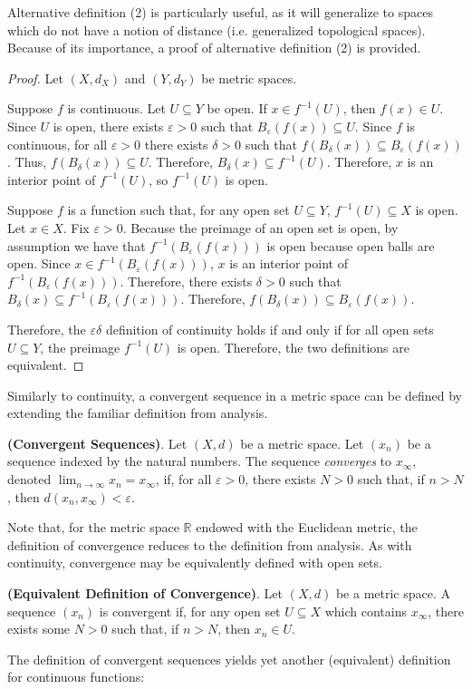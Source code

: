 Alternative definition (2) is particularly useful, as it will generalize to spaces which do not have a notion of distance (i.e. generalized topological spaces). Because of its importance, a proof of alternative definition (2) is provided.
\begin{framed}
\newpage\begin{proof}
    Let $(X,d_X)$ and $(Y,d_Y)$ be metric spaces.
    
    Suppose $f$ is continuous. Let $U\subseteq Y$ be open. If $x\in f^{-1}(U)$, then $f(x)\in U$. Since $U$ is open, there exists $\varepsilon>0$ such that $B_\varepsilon(f(x))\subseteq U$. Since $f$ is continuous, for all $\varepsilon>0$ there exists $\delta>0$ such that $f(B_\delta(x))\subseteq B_\varepsilon(f(x))$. Thus, $f(B_\delta(x))\subseteq U$. Therefore, $B_\delta(x)\subseteq f^{-1}(U)$. Therefore, $x$ is an interior point of $f^{-1}(U)$, so $f^{-1}(U)$ is open.


    Suppose $f$ is a function such that, for any open set $U\subseteq Y$, $f^{-1}(U)\subseteq X$ is open. Let $x\in X$. Fix $\varepsilon>0$. Because the preimage of an open set is open, by assumption we have that $f^{-1}(B_\varepsilon(f(x)))$ is open because open balls are open. Since $x\in f^{-1}(B_\varepsilon(f(x)))$, $x$ is an interior point of $f^{-1}(B_\varepsilon(f(x)))$. Therefore, there exists $\delta>0$ such that $B_\delta(x)\subseteq f^{-1}(B_\varepsilon(f(x)))$. Therefore, $f(B_\delta(x))\subseteq B_\varepsilon(f(x))$.

    Therefore, the $\varepsilon\delta$ definition of continuity holds if and only if for all open sets $U\subseteq Y$, the preimage $f^{-1}(U)$ is open. Therefore, the two definitions are equivalent.
\end{proof}
\end{framed}

Similarly to continuity, a convergent sequence in a metric space can be defined by extending the familiar definition from analysis.
\begin{defn} \textbf{(Convergent Sequences)}. Let $(X,d)$ be a metric space. Let $(x_n)$ be a sequence indexed by the natural numbers. The sequence \textit{converges} to $x_\infty$, denoted $\lim_{n\to\infty} x_n = x_\infty$, if, for all $\varepsilon>0$, there exists $N>0$ such that, if $n>N$, then $d(x_n,x_\infty)<\varepsilon$.
\end{defn}
Note that, for the metric space $\mathbb{R}$ endowed with the Euclidean metric, the definition of convergence reduces to the definition from analysis. As with continuity, convergence may be equivalently defined with open sets.
\vspace{1em}
\begin{defn}
    \textbf{(Equivalent Definition of Convergence)}. Let $(X,d)$ be a metric space. A sequence $(x_n)$ is convergent if, for any open set $U\subseteq X$ which contains $x_\infty$, there exists some $N>0$ such that, if $n>N$, then $x_n\in U$.
\end{defn}
The definition of convergent sequences yields yet another (equivalent) definition for continuous functions:

